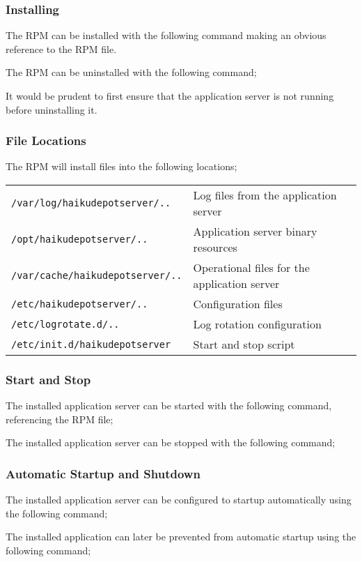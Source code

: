 
\subsubsection{Installing}

The RPM can be installed with the following command making an obvious reference to the RPM file.


The RPM can be uninstalled with the following command;


It would be prudent to first ensure that the application server is not running before uninstalling it.

\subsubsection{File Locations}

The RPM will install files into the following locations;

\begin{tabular}{|l|l|}
\hline
{\tt /var/log/haikudepotserver/..} & Log files from the application server \\
{\tt /opt/haikudepotserver/..} & Application server binary resources \\
{\tt /var/cache/haikudepotserver/..} & Operational files for the application server \\
{\tt /etc/haikudepotserver/..} & Configuration files \\
{\tt /etc/logrotate.d/..} & Log rotation configuration \\
{\tt /etc/init.d/haikudepotserver} & Start and stop script \\
\hline
\end{tabular}

\subsubsection{Start and Stop}

The installed application server can be started with the following command, referencing the RPM file;


The installed application server can be stopped with the following command;


\subsubsection{Automatic Startup and Shutdown}

The installed application server can be configured to startup automatically using the following command;


The installed application can later be prevented from automatic startup using the following command;

